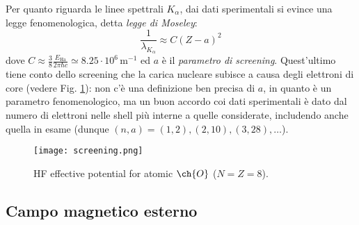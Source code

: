 Per quanto riguarda le linee spettrali $ K_\alpha $, dai dati sperimentali si evince una legge fenomenologica, detta \textit{legge di Moseley}:
\begin{equation}
	\frac{1}{\lambda_{K_\alpha}} \approx C \left( Z - a \right)^2
\end{equation}
dove $ C \approx \frac{3}{8} \frac{E_\text{Ha}}{2\pi \hbar c} \simeq 8.25 \cdot 10^6 \,\text{m}^{-1} $ ed $ a $ è il \textit{parametro di screening}. Quest'ultimo tiene conto dello screening che la carica nucleare subisce a causa degli elettroni di core (vedere Fig. \ref{screening}): non c'è una definizione ben precisa di $ a $, in quanto è un parametro fenomenologico, ma un buon accordo coi dati sperimentali è dato dal numero di elettroni nelle shell più interne a quelle considerate, includendo anche quella in esame (dunque $ (n,a) = (1,2) , (2,10), (3,28), \dots $).

\begin{figure}
	\centering
	\texttt{[image: screening.png]}
	\caption{HF effective potential for atomic $ \ch{O} $ ($ N = Z = 8 $).}
	\label{screening}
\end{figure}

\subsection{Campo magnetico esterno}

